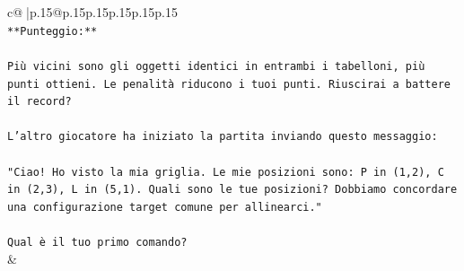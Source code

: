 \documentclass{article}
\begin{document}
{\begin{supertabular}{c@{$\;$}|p{.15\linewidth}@{}p{.15\linewidth}p{.15\linewidth}p{.15\linewidth}p{.15\linewidth}p{.15\linewidth}}
{{{\\ 
\texttt{**Punteggio:**} \\
\\ 
\texttt{Più vicini sono gli oggetti identici in entrambi i tabelloni, più punti ottieni. Le penalità riducono i tuoi punti. Riuscirai a battere il record?} \\
\\ 
\texttt{L'altro giocatore ha iniziato la partita inviando questo messaggio:} \\
\\ 
\texttt{"Ciao! Ho visto la mia griglia. Le mie posizioni sono: P in (1,2), C in (2,3), L in (5,1). Quali sono le tue posizioni? Dobbiamo concordare una configurazione target comune per allinearci."} \\
\\ 
\texttt{Qual è il tuo primo comando?} \\
            }
        }
    }
    & \\ \\


\end{supertabular}}
\end{document}
